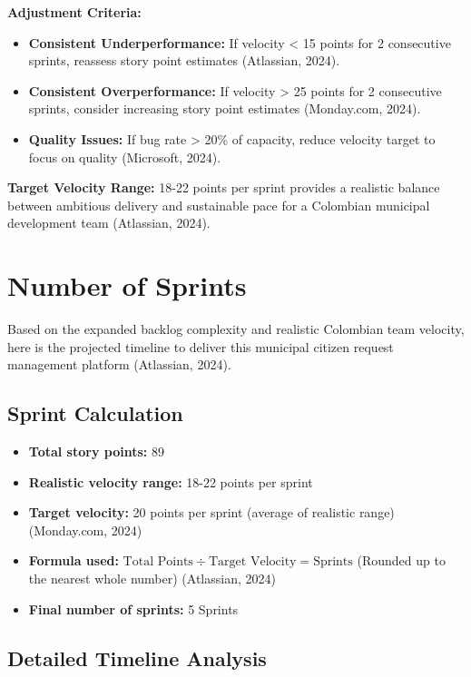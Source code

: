 \documentclass[12pt,a4paper]{article}
\begin{document}
\textbf{Adjustment Criteria:}
\begin{itemize}
    \item \textbf{Consistent Underperformance:} If velocity < 15 points for 2 consecutive sprints, reassess story point estimates (Atlassian, 2024).
    \item \textbf{Consistent Overperformance:} If velocity > 25 points for 2 consecutive sprints, consider increasing story point estimates (Monday.com, 2024).
    \item \textbf{Quality Issues:} If bug rate > 20\% of capacity, reduce velocity target to focus on quality (Microsoft, 2024).
\end{itemize}

\textbf{Target Velocity Range:} 18-22 points per sprint provides a realistic balance between ambitious delivery and sustainable pace for a Colombian municipal development team (Atlassian, 2024).

\section{Number of Sprints}

Based on the expanded backlog complexity and realistic Colombian team velocity, here is the projected timeline to deliver this municipal citizen request management platform (Atlassian, 2024).

\subsection{Sprint Calculation}

\begin{itemize}
    \item \textbf{Total story points:} 89
    \item \textbf{Realistic velocity range:} 18-22 points per sprint
    \item \textbf{Target velocity:} 20 points per sprint (average of realistic range) (Monday.com, 2024)
    \item \textbf{Formula used:} $\text{Total Points} \div \text{Target Velocity} = \text{Sprints}$ (Rounded up to the nearest whole number) (Atlassian, 2024)
    \item \textbf{Final number of sprints:} 5 Sprints
\end{itemize}

\subsection{Detailed Timeline Analysis}
\end{document}
